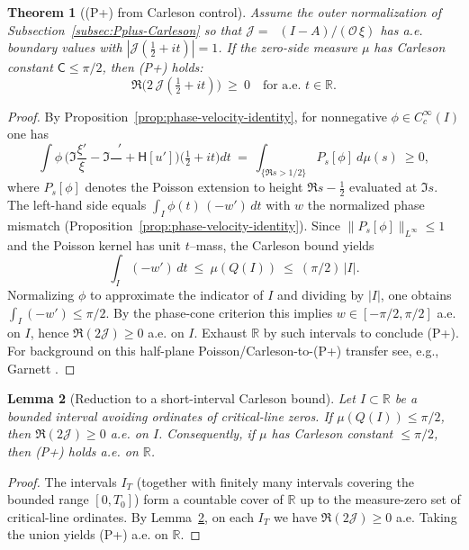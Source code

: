 \documentclass[11pt]{article}
\newtheorem{theorem}{Theorem}
\newtheorem{lemma}[theorem]{Lemma}
\theoremstyle{definition}
\theoremstyle{remark}
\newcommand{\R}{\mathbb{R}}
\DeclareMathOperator{\dettwo}{det_2}
\begin{document}
\begin{theorem}[(P+) from Carleson control]\label{thm:Pplus-from-Carleson}
Assume the outer normalization of Subsection~\ref{subsec:Pplus-Carleson} so that \(\mathcal J=\dettwo(I-A)/(\mathcal O\,\xi)\) has a.e. boundary values with \(|\mathcal J(\tfrac12+it)|=1\). If the zero-side measure \(\mu\) has Carleson constant \(\mathsf C\le \pi/2\), then \emph{(P+)} holds:
\[
 \Re\big(2\,\mathcal J(\tfrac12+it)\big)\ \ge\ 0\quad\text{for a.e. }t\in\R.
\]
\end{theorem}
\begin{proof}
By Proposition~\ref{prop:phase-velocity-identity}, for nonnegative \(\phi\in C_c^\infty(I)\) one has
\[
 \int\!\phi\,\Big(\Im\frac{\xi'}{\xi}-\Im\frac{\dettwo'}{\dettwo}+\mathsf H[u']\Big)\Big(\tfrac12+it\Big)dt\ =\ \int_{\{\Re s>1/2\}} P_{s}\![\phi] \ d\mu(s)\ \ge 0,
\]
where \(P_{s}[\phi]\) denotes the Poisson extension to height \(\Re s-\tfrac12\) evaluated at \(\Im s\). The left-hand side equals \(\int_I \phi(t)\,(-w')\,dt\) with \(w\) the normalized phase mismatch (Proposition~\ref{prop:phase-velocity-identity}). Since \(\|P_{s}[\phi]\|_{L^\infty}\le 1\) and the Poisson kernel has unit \(t\)–mass, the Carleson bound yields
\[
 \int_I (-w')\,dt\ \le\ \mu(Q(I))\ \le\ (\pi/2)\,|I|.
\]
Normalizing \(\phi\) to approximate the indicator of \(I\) and dividing by \(|I|\), one obtains \(\int_I (-w')\le \pi/2\). By the phase-cone criterion this implies \(w\in[-\pi/2,\pi/2]\) a.e. on \(I\), hence \(\Re(2\mathcal J)\ge 0\) a.e. on \(I\). Exhaust \(\R\) by such intervals to conclude (P+). For background on this half-plane Poisson/Carleson-to-(P+) transfer see, e.g., Garnett \cite[Ch.~IV]{Garnett}.
\end{proof}
\begin{lemma}[Reduction to a short-interval Carleson bound]\label{lem:no-P}
Let \(I\subset\R\) be a bounded interval avoiding ordinates of critical-line zeros. If \(\mu(Q(I))\le \pi/2\), then \(\Re(2\mathcal J)\ge 0\) a.e. on \(I\). Consequently, if \(\mu\) has Carleson constant \(\le \pi/2\), then \emph{(P+)} holds a.e. on \(\R\).
\end{lemma}
\begin{proof}
The intervals \(I_T\) (together with finitely many intervals covering the bounded range \([0,T_0]\)) form a countable cover of \(\R\) up to the measure-zero set of critical-line ordinates. By Lemma~\ref{lem:no-P}, on each \(I_T\) we have \(\Re(2\mathcal J)\ge 0\) a.e. Taking the union yields (P+) a.e. on \(\R\).
\end{proof}
\end{document}
